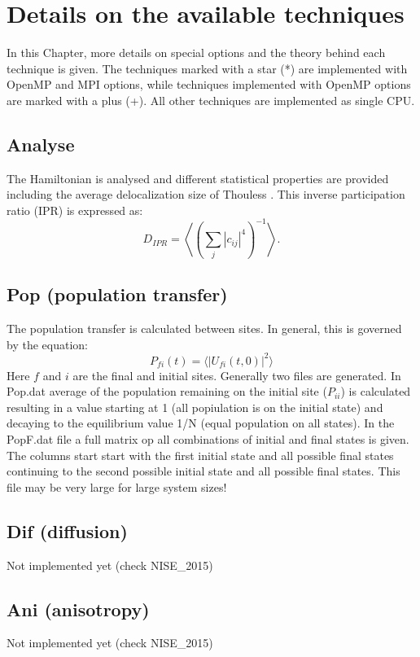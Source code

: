 \chapter{\label{chap:techniques}Details on the available techniques}
In this Chapter, more details on special options and the theory behind each technique is given. The techniques marked with a star (*) are implemented with OpenMP and MPI options, while techniques implemented with OpenMP options are marked with a plus (+). All other techniques are implemented as single CPU. 
\section{Analyse}
The Hamiltonian is analysed and different statistical properties are provided including the average delocalization size of Thouless \cite{Thouless.1974.PR.13.93}. This inverse participation ratio (IPR) is expressed as:
\begin{equation}
	D_{IPR}=\left\langle\left(\sum_j |c_{ij}|^{4}\right)^{-1}\right \rangle.
\end{equation}
\section{Pop (population transfer)}
The population transfer is calculated between sites. In general, this is governed by the equation:
\begin{equation}
P_{fi}(t)=\langle |U_{fi}(t,0)|^2 \rangle
\end{equation}
Here $f$ and $i$ are the final and initial sites. Generally two files are generated. In Pop.dat average of the population remaining on the initial site ($P_{ii}$) is calculated resulting in a value starting at 1 (all popiulation is on the initial state) and decaying to the equilibrium value 1/N (equal population on all states). In the PopF.dat file a full matrix op all combinations of initial and final states is given. The columns start start with the first initial state and all possible final states continuing to the second possible initial state and all possible final states. This file may be very large for large system sizes!
\section{Dif (diffusion)}
Not implemented yet (check NISE\_2015)
\section{Ani (anisotropy)}
Not implemented yet (check NISE\_2015)
